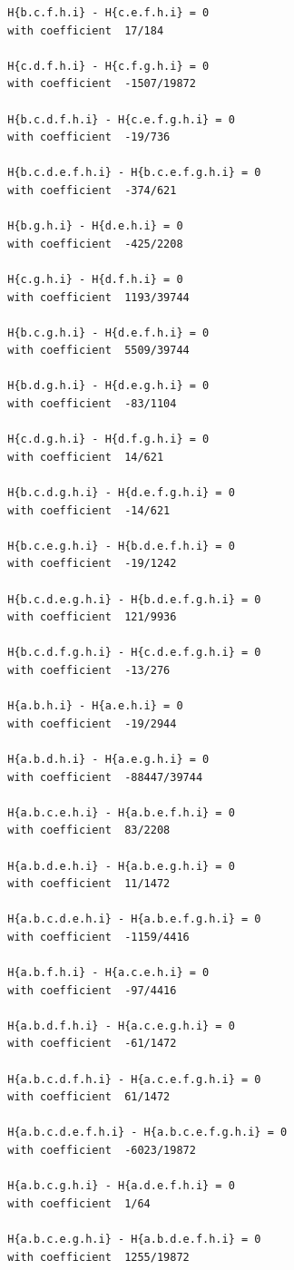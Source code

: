 \documentclass[11pt, a4paper]{kybernetika}
\begin{document}
\begin{verbatim}
		H{b.c.f.h.i} - H{c.e.f.h.i} = 0
		with coefficient  17/184
		
		H{c.d.f.h.i} - H{c.f.g.h.i} = 0
		with coefficient  -1507/19872
		
		H{b.c.d.f.h.i} - H{c.e.f.g.h.i} = 0
		with coefficient  -19/736
		
		H{b.c.d.e.f.h.i} - H{b.c.e.f.g.h.i} = 0
		with coefficient  -374/621
		
		H{b.g.h.i} - H{d.e.h.i} = 0
		with coefficient  -425/2208
		
		H{c.g.h.i} - H{d.f.h.i} = 0
		with coefficient  1193/39744
		
		H{b.c.g.h.i} - H{d.e.f.h.i} = 0
		with coefficient  5509/39744
		
		H{b.d.g.h.i} - H{d.e.g.h.i} = 0
		with coefficient  -83/1104
		
		H{c.d.g.h.i} - H{d.f.g.h.i} = 0
		with coefficient  14/621
		
		H{b.c.d.g.h.i} - H{d.e.f.g.h.i} = 0
		with coefficient  -14/621
		
		H{b.c.e.g.h.i} - H{b.d.e.f.h.i} = 0
		with coefficient  -19/1242
		
		H{b.c.d.e.g.h.i} - H{b.d.e.f.g.h.i} = 0
		with coefficient  121/9936
		
		H{b.c.d.f.g.h.i} - H{c.d.e.f.g.h.i} = 0
		with coefficient  -13/276
		
		H{a.b.h.i} - H{a.e.h.i} = 0
		with coefficient  -19/2944
		
		H{a.b.d.h.i} - H{a.e.g.h.i} = 0
		with coefficient  -88447/39744
		
		H{a.b.c.e.h.i} - H{a.b.e.f.h.i} = 0
		with coefficient  83/2208
		
		H{a.b.d.e.h.i} - H{a.b.e.g.h.i} = 0
		with coefficient  11/1472
		
		H{a.b.c.d.e.h.i} - H{a.b.e.f.g.h.i} = 0
		with coefficient  -1159/4416
		
		H{a.b.f.h.i} - H{a.c.e.h.i} = 0
		with coefficient  -97/4416
		
		H{a.b.d.f.h.i} - H{a.c.e.g.h.i} = 0
		with coefficient  -61/1472
		
		H{a.b.c.d.f.h.i} - H{a.c.e.f.g.h.i} = 0
		with coefficient  61/1472
		
		H{a.b.c.d.e.f.h.i} - H{a.b.c.e.f.g.h.i} = 0
		with coefficient  -6023/19872
		
		H{a.b.c.g.h.i} - H{a.d.e.f.h.i} = 0
		with coefficient  1/64
		
		H{a.b.c.e.g.h.i} - H{a.b.d.e.f.h.i} = 0
		with coefficient  1255/19872
		

\end{verbatim}
\end{document}
